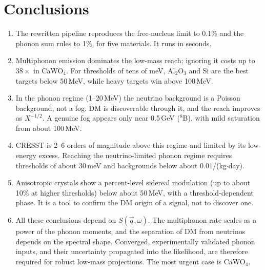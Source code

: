 \documentclass[11pt,a4paper]{article}
\numberwithin{equation}{section}
\newcommand{\qv}{\vec q}
\begin{document}
\section{Conclusions}
\begin{enumerate}
  \item The rewritten pipeline reproduces the free-nucleus limit to 0.1\% and the
  phonon sum rules to 1\%, for five materials. It runs in seconds.
  \item Multiphonon emission dominates the low-mass reach; ignoring it costs up to $38\times$
  in CaWO$_4$. For thresholds of tens of meV, Al$_2$O$_3$ and Si are the best targets below
  50\,MeV, while heavy targets win above 100\,MeV.
  \item In the phonon regime (1--20\,MeV) the neutrino background is a Poisson background,
  not a fog. DM is discoverable through it, and the reach improves as $X^{-1/2}$. A genuine
  fog appears only near 0.5\,GeV ($^8$B), with mild saturation from about 100\,MeV.
  \item CRESST is 2--6 orders of magnitude above this regime and limited by its low-energy
  excess. Reaching the neutrino-limited phonon regime requires thresholds of about 30\,meV
  and backgrounds below about 0.01/(kg$\cdot$day).
  \item Anisotropic crystals show a percent-level sidereal modulation (up to about 10\% at
  higher thresholds) below about 50\,MeV, with a threshold-dependent phase. It is a tool to
  confirm the DM origin of a signal, not to discover one.
  \item All these conclusions depend on $S(\qv,\omega)$. The multiphonon rate scales as a
  power of the phonon moments, and the separation of DM from neutrinos depends on the
  spectral shape. Converged, experimentally validated phonon inputs, and their uncertainty
  propagated into the likelihood, are therefore required for robust low-mass projections.
  The most urgent case is CaWO$_4$.
\end{enumerate}
\end{document}
